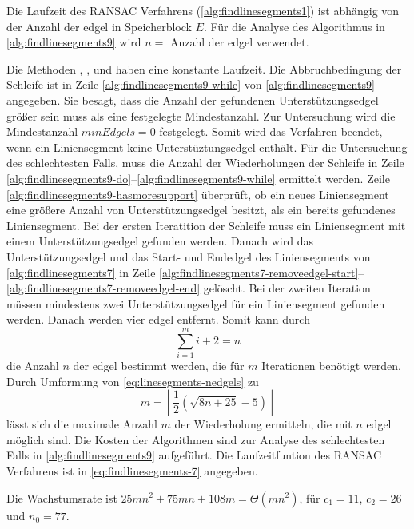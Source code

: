 Die Laufzeit des RANSAC Verfahrens (\autoref{alg:findlinesegments1}) ist abhängig von der Anzahl der \gls{edgel} in
 Speicherblock $E$. Für die Analyse des Algorithmus in \autoref{alg:findlinesegments9} wird $n = $ Anzahl der
 \gls{edgel} verwendet.

Die Methoden , ,  und 
 haben eine konstante Laufzeit. Die Abbruchbedingung der Schleife ist in Zeile \ref{alg:findlinesegments9-while} von
 \autoref{alg:findlinesegments9} angegeben. Sie besagt, dass die Anzahl der gefundenen Unterstützungsedgel größer sein
 muss als eine festgelegte Mindestanzahl. Zur Untersuchung wird die Mindestanzahl $\mathit{minEdgels} = 0$ festgelegt.
 Somit wird das Verfahren beendet, wenn ein Liniensegment keine Unterstüztungsedgel enthält. Für die Untersuchung des
 schlechtesten Falls, muss die Anzahl der Wiederholungen der Schleife in Zeile
 \ref{alg:findlinesegments9-do}--\ref{alg:findlinesegments9-while} ermittelt werden. Zeile
 \ref{alg:findlinesegments9-hasmoresupport} überprüft, ob ein neues Liniensegment eine größere Anzahl von
 Unterstützungsedgel besitzt, als ein bereits gefundenes Liniensegment. Bei der ersten Iteratition der Schleife muss
 ein Liniensegment mit einem Unterstützungsedgel gefunden werden. Danach wird das Unterstützungsedgel und das Start-
 und Endedgel des Liniensegments von \autoref{alg:findlinesegments7} in Zeile
 \ref{alg:findlinesegments7-removeedgel-start}--\ref{alg:findlinesegments7-removeedgel-end} gelöscht. Bei der zweiten
 Iteration müssen mindestens zwei Unterstützungsedgel für ein Liniensegment gefunden werden. Danach werden vier
 \gls{edgel} entfernt. Somit kann durch
\begin{equation}
\label{eq:linesegments-nedgels}
\sum_{i=1}^{m} i + 2 = n
\end{equation}
die Anzahl $n$ der \gls{edgel} bestimmt werden, die für $m$ Iterationen benötigt werden. Durch Umformung von \autoref{eq:linesegments-nedgels} zu
\begin{equation}
\label{eq:linesegments-miteration}
m = \left\lfloor\frac{1}{2}(\sqrt{8n+25} - 5)\right\rfloor
\end{equation}
lässt sich die maximale Anzahl $m$ der Wiederholung ermitteln, die mit $n$ \gls{edgel} möglich sind. %
Die Kosten der  Algorithmen sind zur Analyse des schlechtesten Falls in \autoref{alg:findlinesegments9} aufgeführt. Die
 Laufzeitfuntion des RANSAC Verfahrens ist in \autoref{eq:findlinesegments-7} angegeben.

Die Wachstumsrate ist $25mn^2 + 75mn + 108m = \Theta(mn^2)$, für $c_{1} = 11$, $c_{2} = 26$ und $n_{0} = 77$.

